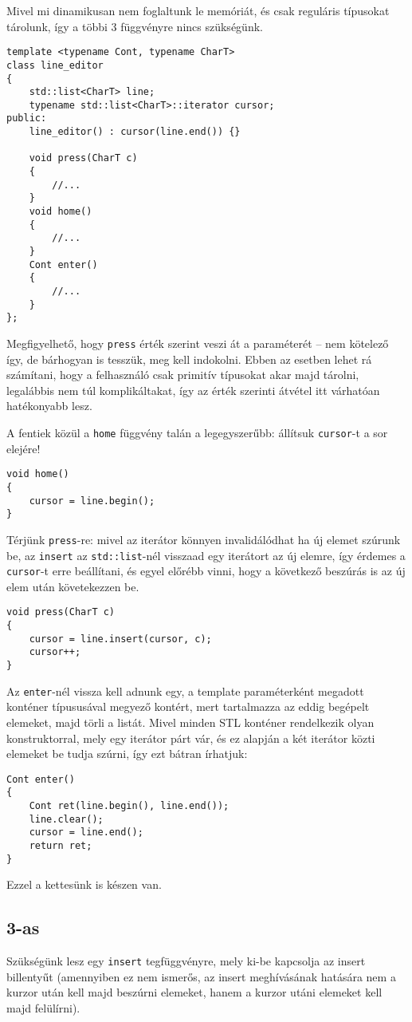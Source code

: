 \documentclass[a4paper,11.5pt,table]{article}
\begin{document}
	Mivel mi dinamikusan nem foglaltunk le memóriát, és csak reguláris típusokat tárolunk, így a többi 3 függvényre nincs szükségünk.
\begin{lstlisting}
template <typename Cont, typename CharT>
class line_editor
{
	std::list<CharT> line;
	typename std::list<CharT>::iterator cursor;
public:
	line_editor() : cursor(line.end()) {}
	
	void press(CharT c)
	{
		//...
	}
	void home()
	{
		//...
	}
	Cont enter()
	{
		//...
	}
};
\end{lstlisting}
	\begin{note}
		Megfigyelhető, hogy \texttt{press} érték szerint veszi át a paraméterét -- nem kötelező így, de bárhogyan is tesszük, meg kell indokolni. Ebben az esetben lehet rá számítani, hogy a felhasználó csak primitív típusokat akar majd tárolni, legalábbis nem túl komplikáltakat, így az érték szerinti átvétel itt várhatóan hatékonyabb lesz.
	\end{note}
	A fentiek közül a \texttt{home} függvény talán a legegyszerűbb: állítsuk \texttt{cursor}-t a sor elejére!
	\begin{lstlisting}
void home()
{
	cursor = line.begin();
}
	\end{lstlisting}
	Térjünk \texttt{press}-re: mivel az iterátor könnyen invalidálódhat ha új elemet szúrunk be, az \texttt{insert} az \texttt{std::list}-nél visszaad egy iterátort az új elemre, így érdemes a \texttt{cursor}-t erre beállítani, és egyel előrébb vinni, hogy a következő beszúrás is az új elem után követekezzen be.
	\begin{lstlisting}
void press(CharT c)
{
	cursor = line.insert(cursor, c);
	cursor++;
}
	\end{lstlisting}
	Az \texttt{enter}-nél vissza kell adnunk egy, a template paraméterként megadott konténer típususával megyező kontért, mert tartalmazza az eddig begépelt elemeket, majd törli a listát. Mivel minden STL konténer rendelkezik olyan konstruktorral, mely egy iterátor párt vár, és ez alapján a két iterátor közti elemeket be tudja szúrni, így ezt bátran írhatjuk:
	\begin{lstlisting}
Cont enter()
{
	Cont ret(line.begin(), line.end());
	line.clear();
	cursor = line.end();
	return ret;
}
	\end{lstlisting}
	Ezzel a kettesünk is készen van.
	\subsection{3-as}
	Szükségünk lesz egy \texttt{insert} tegfüggvényre, mely ki-be kapcsolja az insert billentyűt (amennyiben ez nem ismerős, az insert meghívásának hatására nem a kurzor után kell majd beszúrni elemeket, hanem a kurzor utáni elemeket kell majd felülírni).
	
\end{document}
